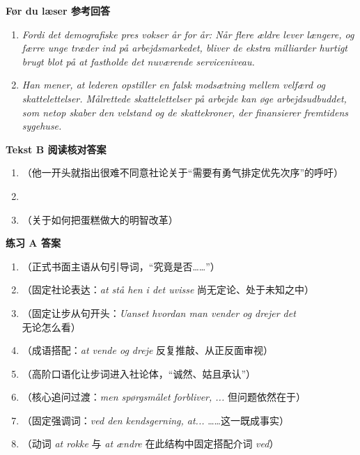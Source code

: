 \begin{answerbox}
\textbf{Før du læser 参考回答}
\begin{enumerate}
  \item \textit{Fordi det demografiske pres vokser år for år: Når flere ældre lever længere, og færre unge træder ind på arbejdsmarkedet, bliver de ekstra milliarder hurtigt brugt blot på at fastholde det nuværende serviceniveau.}
  \item \textit{Han mener, at lederen opstiller en falsk modsætning mellem velfærd og skattelettelser. Målrettede skattelettelser på arbejde kan øge arbejdsudbuddet, som netop skaber den velstand og de skattekroner, der finansierer fremtidens sygehuse.}
\end{enumerate}

\textbf{Tekst B 阅读核对答案}
\begin{enumerate}
  \item {}（他一开头就指出很难不同意社论关于“需要有勇气排定优先次序”的呼吁）
  \item {}
  \item {}（关于如何把蛋糕做大的明智改革）
\end{enumerate}

\textbf{练习 A 答案}
\begin{enumerate}
  \item {}（正式书面主语从句引导词，“究竟是否……”）
  \item {}（固定社论表达：\textit{at stå hen i det uvisse} 尚无定论、处于未知之中）
  \item {}（固定让步从句开头：\textit{Uanset hvordan man vender og drejer det} 无论怎么看）
  \item {}（成语搭配：\textit{at vende og dreje} 反复推敲、从正反面审视）
  \item {}（高阶口语化让步词进入社论体，“诚然、姑且承认”）
  \item {}（核心追问过渡：\textit{men spørgsmålet forbliver, ...} 但问题依然在于）
  \item {}（固定强调词：\textit{ved den kendsgerning, at...} ……这一既成事实）
  \item {}（动词 \textit{at rokke} 与 \textit{at ændre} 在此结构中固定搭配介词 \textit{ved}）
\end{enumerate}


\end{answerbox}

